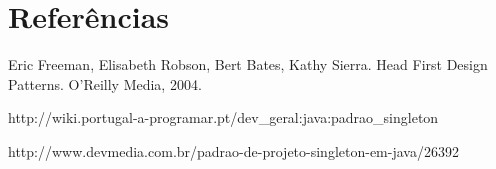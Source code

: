 \section{Referências}

\begin{thebibliography}{99} %

Eric Freeman, Elisabeth Robson, Bert Bates, Kathy Sierra. Head First Design Patterns. O'Reilly Media, 2004.

http://wiki.portugal-a-programar.pt/dev\_geral:java:padrao\_singleton

http://www.devmedia.com.br/padrao-de-projeto-singleton-em-java/26392

\end{thebibliography}
